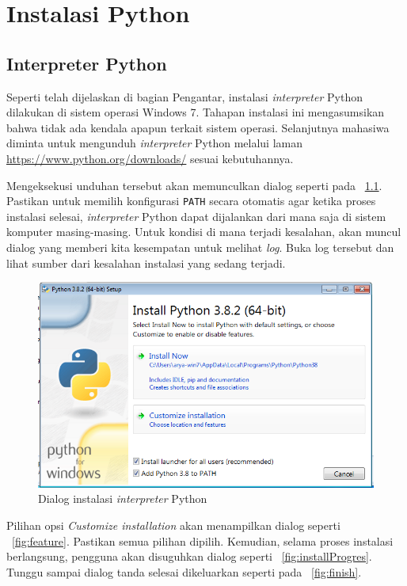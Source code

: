 \chapter{Instalasi Python}
\section{Interpreter Python}
\label{sec:interpreter}
Seperti telah dijelaskan di bagian Pengantar, instalasi \textit{interpreter} Python dilakukan di sistem operasi Windows 7. Tahapan instalasi ini mengasumsikan bahwa tidak ada kendala apapun terkait sistem operasi. Selanjutnya mahasiwa diminta untuk mengunduh \textit{interpreter} Python melalui laman \url{https://www.python.org/downloads/} sesuai kebutuhannya. 

Mengeksekusi unduhan tersebut akan memunculkan dialog seperti pada \figurename~\ref{fig:install1}. Pastikan untuk memilih konfigurasi \texttt{PATH} secara otomatis agar ketika proses instalasi selesai, \textit{interpreter} Python dapat dijalankan dari mana saja di sistem komputer masing-masing. Untuk kondisi di mana terjadi kesalahan, akan muncul dialog yang memberi kita kesempatan untuk melihat \textit{log}. Buka log tersebut dan lihat sumber dari kesalahan instalasi yang sedang terjadi.

\begin{figure}[h!]
   \begin{center}
     \includegraphics[scale=.5]{pics/installPython1.png}
     \caption{Dialog instalasi \textit{interpreter} Python}
     \label{fig:install1}
   \end{center}
 \end{figure} 

Pilihan opsi \textit{Customize installation} akan menampilkan dialog seperti \figurename~\ref{fig:feature}. Pastikan semua pilihan dipilih. Kemudian, selama proses instalasi berlangsung, pengguna akan disuguhkan dialog seperti \figurename~\ref{fig:installProgres}. Tunggu sampai dialog tanda selesai dikeluarkan seperti pada \figurename~\ref{fig:finish}.

